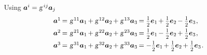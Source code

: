 \begin{otherlanguage}{russian}
\begin{tcolorbox}
\vspace{-0.5em}Using ${\bm{a}^i = \textsl{g}^{\hspace{.32ex}ij} \bm{a}_j}$
\[\begin{array}{l}
\bm{a}^1 \hspace{-0.2ex}=\hspace{.1ex} \textsl{g}^{\hspace{.2ex}11} \bm{a}_1 \hspace{-0.2ex} + \textsl{g}^{\hspace{.2ex}12} \bm{a}_2 \hspace{-0.2ex} + \textsl{g}^{\hspace{.2ex}13} \bm{a}_3 \hspace{-0.2ex} = \smalldisplaystyleonehalf \bm{e}_1 \hspace{-0.2ex} + \smalldisplaystyleonehalf \bm{e}_2 \hspace{-0.2ex} - \smalldisplaystyleonehalf \bm{e}_3 \hspace{.1ex},\\[.5em]
%
\bm{a}^2 \hspace{-0.2ex}=\hspace{.1ex} \textsl{g}^{\hspace{.2ex}21} \bm{a}_1 \hspace{-0.2ex} + \textsl{g}^{\hspace{.2ex}22} \bm{a}_2 \hspace{-0.2ex} + \textsl{g}^{\hspace{.2ex}23} \bm{a}_3 \hspace{-0.2ex} = \smalldisplaystyleonehalf \bm{e}_1 \hspace{-0.2ex} - \smalldisplaystyleonehalf \bm{e}_2 \hspace{-0.2ex} + \smalldisplaystyleonehalf \bm{e}_3 \hspace{.1ex},\\[.5em]
%
\bm{a}^3 \hspace{-0.2ex}=\hspace{.1ex} \textsl{g}^{\hspace{.2ex}31} \bm{a}_1 \hspace{-0.2ex} + \textsl{g}^{\hspace{.2ex}32} \bm{a}_2 \hspace{-0.2ex} + \textsl{g}^{\hspace{.2ex}33} \bm{a}_3 \hspace{-0.2ex} = - \smalldisplaystyleonehalf \bm{e}_1 \hspace{-0.2ex} + \smalldisplaystyleonehalf \bm{e}_2 \hspace{-0.2ex} + \smalldisplaystyleonehalf \bm{e}_3 \hspace{.16ex}.
\end{array}\]


\end{tcolorbox}
\end{otherlanguage}
